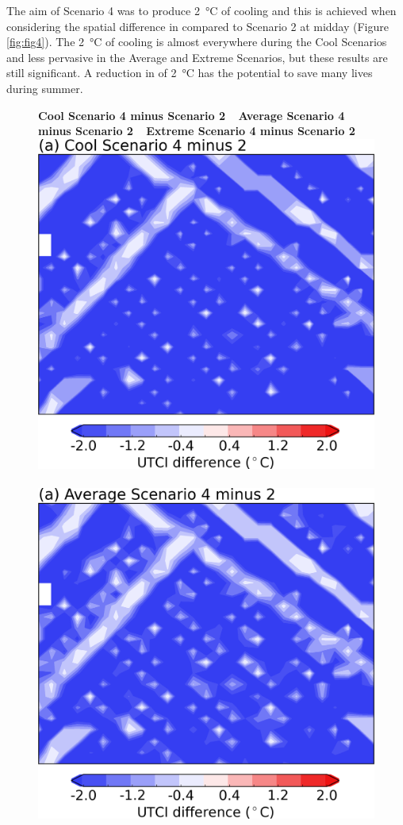 \documentclass[final,3p,times,authoryear]{elsarticle}
\begin{document}
The aim of Scenario 4 was to produce 2\SI{}{\degreeCelsius} of cooling and this is achieved when considering the spatial difference in  compared to Scenario 2 at midday (Figure \ref{fig:fig4}). The 2\SI{}{\degreeCelsius} of cooling is almost everywhere during the Cool Scenarios and less pervasive in the Average and Extreme Scenarios, but these results are still significant. A reduction in  of 2\SI{}{\degreeCelsius} has the potential to save many lives during summer.


\begin{figure}[!htbp]
\centering  
\textbf{Cool Scenario 4 minus Scenario 2} ~
\textbf{Average Scenario 4 minus Scenario 2} ~
\textbf{Extreme Scenario 4 minus Scenario 2} 
\includegraphics[scale=0.30]{images/fig4a}
~
\includegraphics[scale=0.30]{images/fig4b} 

\end{figure}
\end{document}
